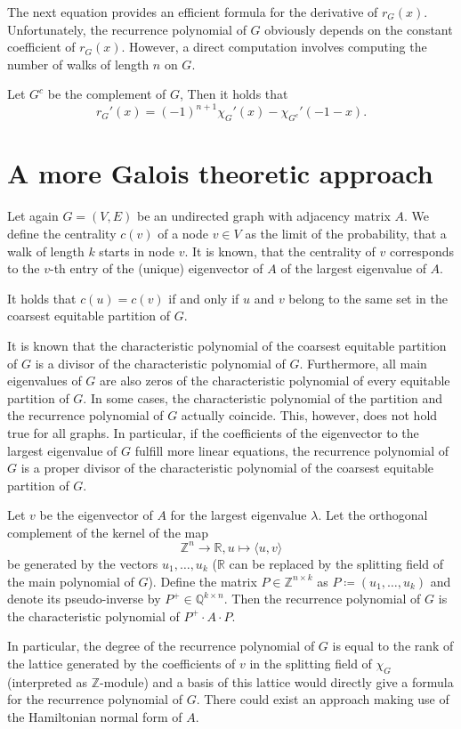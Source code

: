 \documentclass[a4paper,12pt]{article}
\begin{document}
The next equation provides an efficient formula for the derivative of $r_G(x)$. Unfortunately, the recurrence polynomial of $G$ obviously depends on the constant coefficient of $r_G(x)$. However, a direct computation involves computing the number of walks of length $n$ on $G$.

\begin{lemma}
Let $G^c$ be the complement of $G$, Then it holds that
$$
r_G'(x) = (-1)^{n+1}\chi_G'(x) - \chi_{G^c}'(-1-x).
$$
\end{lemma}

\section{A more Galois theoretic approach}

Let again $G=(V,E)$ be an undirected graph with adjacency matrix $A$. We define the centrality $c(v)$ of a node $v\in V$ as the limit of the probability, that a walk of length $k$ starts in node $v$. It is known, that the centrality of $v$ corresponds to the $v$-th entry of the (unique) eigenvector of $A$ of the largest eigenvalue of $A$.

\begin{lemma}
It holds that $c(u) = c(v)$ if and only if $u$ and $v$ belong to the same set in the coarsest equitable partition of $G$.
\end{lemma}

It is known that the characteristic polynomial of the coarsest equitable partition of $G$ is a divisor of the characteristic polynomial of $G$. Furthermore, all main eigenvalues of $G$ are also zeros of the characteristic polynomial of every equitable partition of $G$. In some cases, the characteristic polynomial of the partition and the recurrence polynomial of $G$ actually coincide. This, however, does not hold true for all graphs. In particular, if the coefficients of the eigenvector to the largest eigenvalue of $G$ fulfill more linear equations, the recurrence polynomial of $G$ is a proper divisor of the characteristic polynomial of the coarsest equitable partition of $G$.

\begin{lemma}
Let $v$ be the eigenvector of $A$ for the largest eigenvalue $\lambda$. Let the orthogonal complement of the kernel of the map 
$$
\mathbb{Z}^n \to \mathbb{R}, u \mapsto \langle u, v \rangle
$$
be generated by the vectors $u_1, \ldots, u_k$ ($\mathbb{R}$ can be replaced by the splitting field of the main polynomial of $G$).
Define the matrix $P\in\mathbb{Z}^{n \times k}$ as $P \coloneqq (u_1, \ldots, u_k)$ and denote its pseudo-inverse by $P^+ \in \mathbb{Q}^{k\times n}$. Then the recurrence polynomial of $G$ is the characteristic polynomial of $P^+ \cdot A \cdot P$.
\end{lemma}

In particular, the degree of the recurrence polynomial of $G$ is equal to the rank of the lattice generated by the coefficients of $v$ in the splitting field of $\chi_G$ (interpreted as $\mathbb{Z}$-module) and a basis of this lattice would directly give a formula for the recurrence polynomial of $G$. There could exist an approach making use of the Hamiltonian normal form of $A$.
\end{document}

